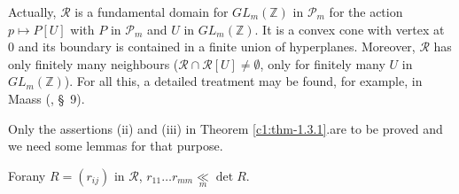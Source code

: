 Actually, $\mathscr{R}$ is a fundamental domain for
$GL_{m}(\mathbb{Z})$ in $\mathscr{P}_{m}$ for the action $p\mapsto
P[U]$ with $P$ in $\mathscr{P}_{m}$ and $U$ in
$GL_{m}(\mathbb{Z})$. It is a convex cone with vertex at $0$ and its
boundary is contained in a finite union of hyperplanes. Moreover,
$\mathscr{R}$ has only finitely many neighbours (\ie $\mathscr{R}\cap
\mathscr{R}[U]\neq \emptyset$, only for finitely many $U$ in
$GL_{m}(\mathbb{Z})$). For all this, a detailed treatment may be
found, for example, in Maass (\cite{key17}, \S\ 9).

Only the assertions (ii) and (iii) in Theorem \ref{c1:thm-1.3.1}.\@ are
to be proved and we need some lemmas for that purpose. 

\setcounter{sublemma}{1}
\begin{sublemma}\label{c1:lem-1.3.2}
For\pageoriginale any $R=(r_{ij})$ in $\mathscr{R}$, $r_{11}\ldots
r_{mm}\mathop{\ll}\limits_{m}\det R$.
\end{sublemma}

